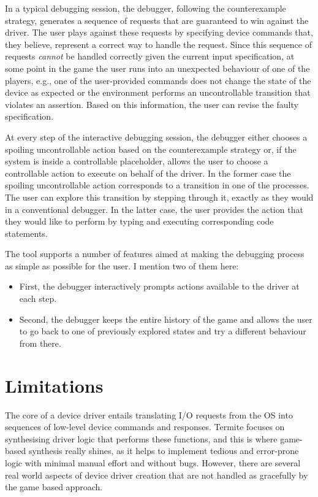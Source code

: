 In a typical debugging session, the debugger, following the counterexample strategy, generates a sequence of requests that are guaranteed to win against the driver.  The user plays against these requests by specifying device commands that, they believe, represent a correct way to handle the request.  Since this sequence of requests \emph{cannot} be handled correctly given the current input specification, at some point in the game the user runs into an unexpected behaviour of one of the players, e.g., one of the user-provided commands does not change the state of the device as expected or the environment performs an uncontrollable transition that violates an assertion.  Based on this information, the user can revise the faulty specification.

At every step of the interactive debugging session, the debugger either chooses a spoiling uncontrollable action based on the counterexample strategy or, if the system is inside a controllable placeholder, allows the user to choose a controllable action to execute on behalf of the driver.  In the former case the spoiling uncontrollable action corresponds to a transition in one of the \tsl processes.  The user can explore this transition by stepping through it, exactly as they would in a conventional debugger.  In the latter case, the user provides the action that they would like to perform by typing and executing corresponding code statements.

The tool supports a number of features aimed at making the debugging process as simple as possible for the user. I mention two of them here: 
\begin{itemize}
    \item First, the debugger interactively prompts actions available to the driver at each step.  
    \item Second, the debugger keeps the entire history of the game and allows the user to go back to one of previously explored states and try a different behaviour from there.
\end{itemize}

\section{Limitations}\label{s:limitations}

The core of a device driver entails translating I/O requests from the OS into sequences of low-level device commands and responses. Termite focuses on synthesising driver logic that performs these functions, and this is where game-based synthesis really shines, as it helps to implement tedious and error-prone logic with minimal manual effort and without bugs. However, there are several real world aspects of device driver creation that are not handled as gracefully by the game based approach.

